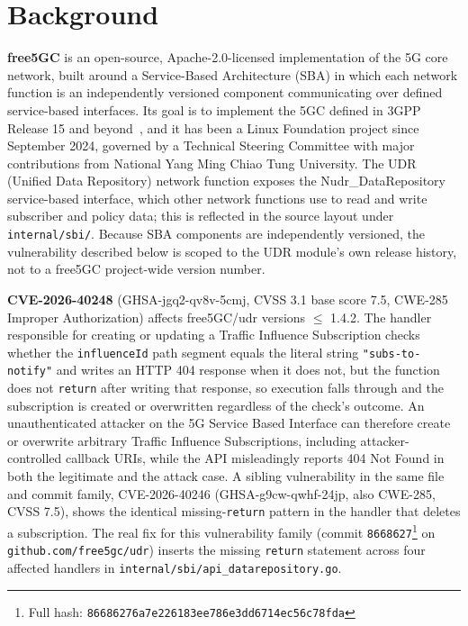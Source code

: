 \documentclass[sigconf]{acmart}
\begin{document}
\section{Background}

\textbf{free5GC} is an open-source, Apache-2.0-licensed implementation
of the 5G core network, built around a Service-Based Architecture
(SBA) in which each network function is an independently versioned
component communicating over defined service-based interfaces. Its
goal is to implement the 5GC defined in 3GPP Release 15 and
beyond~\cite{free5gc}, and it has been a Linux Foundation project since
September 2024, governed by a Technical Steering Committee with major
contributions from National Yang Ming Chiao Tung University. The UDR
(Unified Data Repository) network function exposes the
Nudr\_DataRepository service-based interface, which other network
functions use to read and write subscriber and policy data; this is
reflected in the source layout under \texttt{internal/sbi/}. Because SBA
components are independently versioned, the vulnerability described
below is scoped to the UDR module's own release history, not to a
free5GC project-wide version number.

\textbf{CVE-2026-40248} (GHSA-jgq2-qv8v-5cmj, CVSS 3.1 base score 7.5,
CWE-285 Improper Authorization) affects free5GC/udr versions $\leq$
1.4.2. The handler responsible for creating or updating a Traffic
Influence Subscription checks whether the \texttt{influenceId} path
segment equals the literal string \texttt{"subs-to-notify"} and writes
an HTTP 404 response when it does not, but the function does not
\texttt{return} after writing that response, so execution falls through
and the subscription is created or overwritten regardless of the
check's outcome. An unauthenticated attacker on the 5G Service Based
Interface can therefore create or overwrite arbitrary Traffic Influence
Subscriptions, including attacker-controlled callback URIs, while the
API misleadingly reports 404 Not Found in both the legitimate and the
attack case. A sibling vulnerability in the same file and commit
family, CVE-2026-40246 (GHSA-g9cw-qwhf-24jp, also CWE-285, CVSS 7.5),
shows the identical missing-\texttt{return} pattern in the handler that
deletes a subscription. The real fix for this vulnerability family
(commit \texttt{8668627}\footnote{Full hash:
\texttt{86686276a7e226183ee786e3dd6714ec56c78fda}} on
\texttt{github.com/free5gc/udr}) inserts the missing \texttt{return}
statement across four affected handlers in
\texttt{internal/sbi/api\_datarepository.go}.
\end{document}
